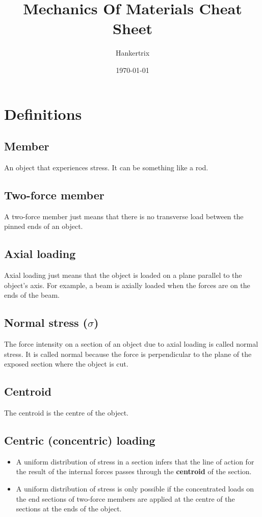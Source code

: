 \documentclass[11pt]{article}
\author{Hankertrix}
\date{\today}
\title{Mechanics Of Materials Cheat Sheet}
\begin{document}
\maketitle
\setcounter{tocdepth}{2}
\tableofcontents \clearpage
\section{Definitions}
\label{sec:orgfe71d07}

\subsection{Member}
\label{sec:orgb1db66b}
An object that experiences stress. It can be something like a rod.

\subsection{Two-force member}
\label{sec:org925641d}
A two-force member just means that there is no transverse load between the pinned ends of an object.

\subsection{Axial loading}
\label{sec:org6d61e6d}
Axial loading just means that the object is loaded on a plane parallel to the object's axis. For example, a beam is axially loaded when the forces are on the ends of the beam.

\subsection{Normal stress (\(\sigma\))}
\label{sec:org5ac0d9a}
The force intensity on a section of an object due to axial loading is called normal stress. It is called normal because the force is perpendicular to the plane of the exposed section where the object is cut.

\subsection{Centroid}
\label{sec:org199ac79}
The centroid is the centre of the object.

\subsection{Centric (concentric) loading}
\label{sec:org6c80214}
\begin{itemize}
\item A uniform distribution of stress in a section infers that the line of action for the result of the internal forces passes through the \textbf{centroid} of the section.
\item A uniform distribution of stress is only possible if the concentrated loads on the end sections of two-force members are applied at the centre of the sections at the ends of the object.
\end{itemize}
\end{document}
